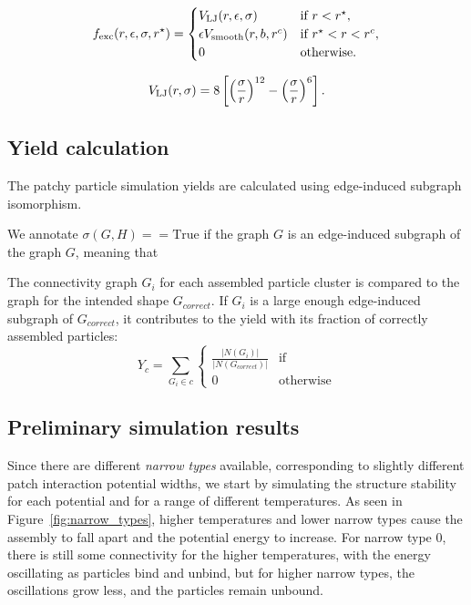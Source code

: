 \begin{equation}
    f_{\rm exc}(r,\epsilon,\sigma,r^{\star}) = \begin{cases}
	V_{\rm LJ}(r, \epsilon, \sigma) & \text{if $r < r^{\star} $},\\
	\epsilon V_{\rm smooth} (r, b, r^c) & \text{if $r^{\star} < r < r^c$},\\
	0 & \text{otherwise}.
	\end{cases} 
\end{equation}

\begin{equation} 
V_{\rm LJ}(r,  \sigma) = 8 \left[ \left(\frac{\sigma}{r}\right) ^{12} - \left(\frac{\sigma}{r}\right) ^{6} \right].
\end{equation}

\subsection{Yield calculation}
The patchy particle simulation yields are calculated using edge-induced subgraph isomorphism. 

We annotate \(\sigma(G,H) == \text{True}\) if the graph \(G\) is an edge-induced subgraph of the graph \(G\), meaning that

The connectivity graph \(G_i\) for each assembled particle cluster is compared to the graph for the intended shape \(G_{correct}\). If \(G_i\) is a large enough edge-induced subgraph of \(G_{correct}\), it contributes to the yield with its fraction of correctly assembled particles:
\begin{equation}
    Y_{c} = \sum_{G_i \in c} \begin{cases} 
           \frac{\left|N(G_i)\right|}{\left|N(G_{correct})\right|} & \text{if}  \\
                          0 & \text{otherwise}
                        \end{cases}
\end{equation}

\subsection{Preliminary simulation results}
Since there are different \emph{narrow types} available, corresponding to slightly different patch interaction potential widths, we start by simulating the structure stability for each potential and for a range of different temperatures. As seen in Figure~\ref{fig:narrow_types}, higher temperatures and lower narrow types cause the assembly to fall apart and the potential energy to increase. For narrow type 0, there is still some connectivity for the higher temperatures, with the energy oscillating as particles bind and unbind, but for higher narrow types, the oscillations grow less, and the particles remain unbound.


